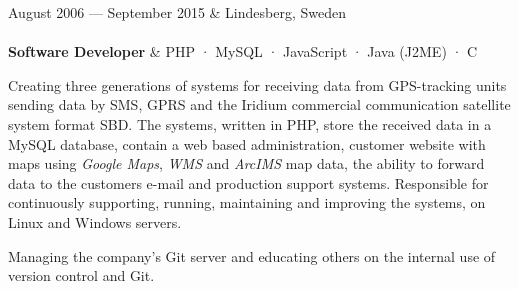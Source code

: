 \documentclass{cv-stylish}
\begin{document}
\begin{center}
\vspace{1em}
\pagebreak
\begin{JobTable}
  August 2006 --- September 2015 & \hfill Lindesberg, Sweden \\[3pt]
   \\[3pt]
  \hspace{5mm} \textbf{Software Developer}
  & \hfill PHP · MySQL · JavaScript · Java (J2ME) · C \\
\end{JobTable}
\begin{adjustwidth}{0.015\linewidth}{0.015\linewidth}
\begin{compactitem}
  \item Creating three generations of systems for receiving data from
    GPS-tracking units sending data by SMS, GPRS and the Iridium
    commercial communication satellite system format SBD.
    The systems, written in PHP, store the received data in a MySQL
    database, contain a web based administration, customer website
    with maps using \emph{Google Maps}, \emph{WMS} and \emph{ArcIMS} map data, the ability to forward
    data to the customers e-mail and production support
    systems. Responsible for continuously supporting, running,
    maintaining and improving the systems, on Linux and Windows
    servers.
  \item Managing the company's Git server and educating others on the
    internal use of version control and Git.
\end{compactitem}
\end{adjustwidth}




\end{center}
\end{document}
